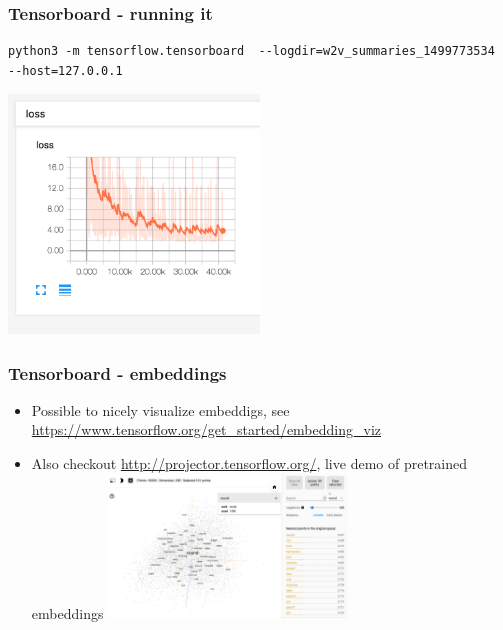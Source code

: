 \documentclass{beamer}
\begin{document}
\begin{frame}[fragile]
 \frametitle{Tensorboard - running it}
 \begin{tiny}
 \begin{lstlisting}
python3 -m tensorflow.tensorboard  --logdir=w2v_summaries_1499773534
--host=127.0.0.1
\end{lstlisting}   
\end{tiny}
 \includegraphics[width=0.5\textwidth]{04_loss}
\end{frame}


\begin{frame}[fragile]
 \frametitle{Tensorboard - embeddings}
   \begin{itemize}
		\item Possible to nicely visualize embeddigs, see \url{https://www.tensorflow.org/get_started/embedding_viz}
		\item Also checkout \url{http://projector.tensorflow.org/}, live demo of pretrained embeddings
		\includegraphics[width=0.5\textwidth]{04_embed_viz.png}
	\end{itemize}
\end{frame}
\end{document}
